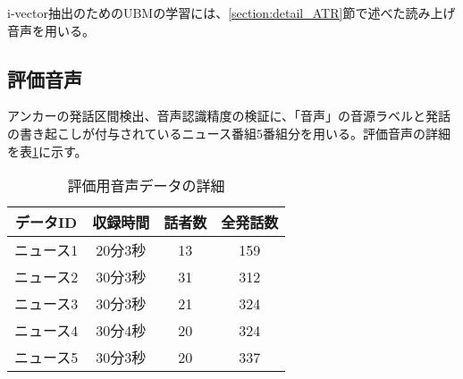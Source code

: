 \vspace{0.2in}\par
i-vector抽出のためのUBMの学習には、\ref{section:detail_ATR}節で述べた読み上げ音声を用いる。

\subsection{評価音声}
アンカーの発話区間検出、音声認識精度の検証に、「音声」の音源ラベルと発話の書き起こしが付与されているニュース番組5番組分を用いる。評価音声の詳細を表\ref{table:test_detail}に示す。

\begin{table}[H]
  \begin{center}
    \caption{評価用音声データの詳細 \label{table:test_detail}}
    \begin{tabular}{|c||c|c|c|} \hline
      データID & 収録時間 & 話者数 & 全発話数 \\ \hline
      ニュース1 & 20分3秒 & 13 & 159 \\ \hline
      ニュース2 & 30分3秒 & 31 & 312\\ \hline
      ニュース3 & 30分3秒 & 21 & 324 \\ \hline
      ニュース4 & 30分4秒 & 20 & 324\\ \hline
      ニュース5 & 30分3秒 & 20 & 337\\ \hline
    \end{tabular}
  \end{center}
\end{table}


